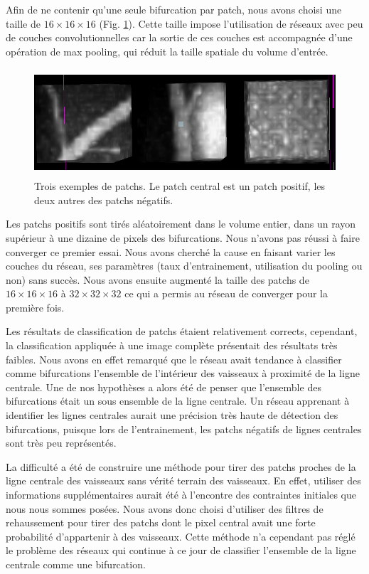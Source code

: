 Afin de ne contenir qu'une seule bifurcation par patch, nous avons choisi une taille de $16 \times 16 \times 16$ (Fig. \ref{fig:exp_patchs}). Cette taille impose l'utilisation de réseaux avec peu de couches convolutionnelles car la sortie de ces couches est accompagnée d'une opération de max pooling, qui réduit la taille spatiale du volume d'entrée. 

\begin{figure}[ht]
    \centering
    \includegraphics[height=4cm]{Images/exp_patchs_exemple.png}
    \caption{Trois exemples de patchs. Le patch central est un patch positif, les deux autres des patchs négatifs.}
    \label{fig:exp_patchs}
\end{figure}

Les patchs positifs sont tirés aléatoirement dans le volume entier, dans un rayon supérieur à une dizaine de pixels des bifurcations. Nous n'avons pas réussi à faire converger ce premier essai. Nous avons cherché la cause en faisant varier les couches du réseau, ses paramètres (taux d'entrainement, utilisation du pooling ou non) sans succès. Nous avons ensuite augmenté la taille des patchs de $16 \times 16 \times 16$ à $32 \times 32 \times 32$ ce qui a permis au réseau de converger pour la première fois.

Les résultats de classification de patchs étaient relativement corrects, cependant, la classification appliquée à une image complète présentait des résultats très faibles. Nous avons en effet remarqué que le réseau avait tendance à classifier comme bifurcations l'ensemble de l'intérieur des vaisseaux à proximité de la ligne centrale. Une de nos hypothèses a alors été de penser que l'ensemble des bifurcations était un sous ensemble de la ligne centrale. Un réseau apprenant à identifier les lignes centrales aurait une précision très haute de détection des bifurcations, puisque lors de l'entrainement, les patchs négatifs de lignes centrales sont très peu représentés. 

La difficulté a été de construire une méthode pour tirer des patchs proches de la ligne centrale des vaisseaux sans vérité terrain des vaisseaux. En effet, utiliser des informations supplémentaires aurait été à l'encontre des contraintes initiales que nous nous sommes posées. Nous avons donc choisi d'utiliser des filtres de rehaussement pour tirer des patchs dont le pixel central avait une forte probabilité d'appartenir à des vaisseaux. Cette méthode n'a cependant pas réglé le problème des réseaux qui continue à ce jour de classifier l'ensemble de la ligne centrale comme une bifurcation.

